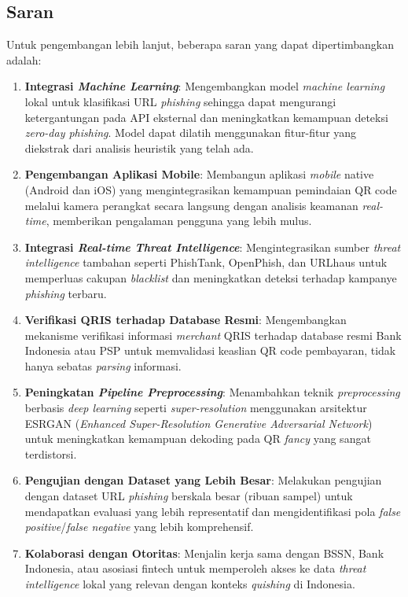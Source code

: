 \documentclass[conference]{IEEEtran}
\begin{document}
\subsection{Saran}

Untuk pengembangan lebih lanjut, beberapa saran yang dapat dipertimbangkan adalah:

\begin{enumerate}[label=\arabic*)]
    \item \textbf{Integrasi \textit{Machine Learning}}: Mengembangkan model \textit{machine learning} lokal untuk klasifikasi URL \textit{phishing} sehingga dapat mengurangi ketergantungan pada API eksternal dan meningkatkan kemampuan deteksi \textit{zero-day phishing}. Model dapat dilatih menggunakan fitur-fitur yang diekstrak dari analisis heuristik yang telah ada.
    
    \item \textbf{Pengembangan Aplikasi Mobile}: Membangun aplikasi \textit{mobile} native (Android dan iOS) yang mengintegrasikan kemampuan pemindaian QR code melalui kamera perangkat secara langsung dengan analisis keamanan \textit{real-time}, memberikan pengalaman pengguna yang lebih mulus.
    
    \item \textbf{Integrasi \textit{Real-time Threat Intelligence}}: Mengintegrasikan sumber \textit{threat intelligence} tambahan seperti PhishTank, OpenPhish, dan URLhaus untuk memperluas cakupan \textit{blacklist} dan meningkatkan deteksi terhadap kampanye \textit{phishing} terbaru.
    
    \item \textbf{Verifikasi QRIS terhadap Database Resmi}: Mengembangkan mekanisme verifikasi informasi \textit{merchant} QRIS terhadap database resmi Bank Indonesia atau PSP untuk memvalidasi keaslian QR code pembayaran, tidak hanya sebatas \textit{parsing} informasi.
    
    \item \textbf{Peningkatan \textit{Pipeline Preprocessing}}: Menambahkan teknik \textit{preprocessing} berbasis \textit{deep learning} seperti \textit{super-resolution} menggunakan arsitektur ESRGAN (\textit{Enhanced Super-Resolution Generative Adversarial Network}) untuk meningkatkan kemampuan dekoding pada QR \textit{fancy} yang sangat terdistorsi.
    
    \item \textbf{Pengujian dengan Dataset yang Lebih Besar}: Melakukan pengujian dengan dataset URL \textit{phishing} berskala besar (ribuan sampel) untuk mendapatkan evaluasi yang lebih representatif dan mengidentifikasi pola \textit{false positive}/\textit{false negative} yang lebih komprehensif.
    
    \item \textbf{Kolaborasi dengan Otoritas}: Menjalin kerja sama dengan BSSN, Bank Indonesia, atau asosiasi fintech untuk memperoleh akses ke data \textit{threat intelligence} lokal yang relevan dengan konteks \textit{quishing} di Indonesia.
\end{enumerate}
\end{document}
